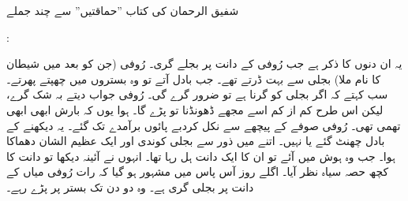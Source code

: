 \documentclass{article}
\begin{document}

\setRTL                 %
\linespread{1.9}        %

\begin{center}          %
شفیق الرحمان کی کتاب ''حماقتیں'' سے چند جملے
\end{center}
\vspace{2\baselineskip}:    %

یہ ان دنوں کا ذکر ہے جب رُوفی کے دانت پر بجلے گری۔ رُوفی (جن کو بعد میں شیطان کا نام ملا) بجلی سے بہت ڈرتے تھے۔ جب بادل آتے تو وہ بستروں میں چھپتے پھرتے۔ سب کہتے کہ اگر بجلی کو گرنا ہے تو ضرور گرے گی۔ رُوفی جواب دیتے بہ شک گرے، لیکن اس طرح کم از کم اسے مجھے ڈھونڈنا تو پڑے گا۔ ہوا یوں کہ بارش ابھی ابھی تھمی تھی۔ رُوفی صوفے کے پیچھے سے نکل کردبے پائوں برآمدے تک گئے۔ یہ دیکھنے کے بادل چھنٹ گئے یا نہیں۔ اتنے میں ذور سے بجلی کوندی اور ایک عظیم الشان دھماکا ہوا۔ جب وہ ہوش میں آئے تو ان کا ایک دانت ہل رہا تھا۔ انہوں نے آئینہ دیکھا تو دانت کا کچھ حصہ سیاہ نظر آیا۔ اگلے روز آس پاس میں مشہور ہو گیا کہ رات رُوفی میاں کے دانت پر بجلی گری ہے۔ وہ دو دن تک بستر پر پڑے رہے۔
\end{document}
